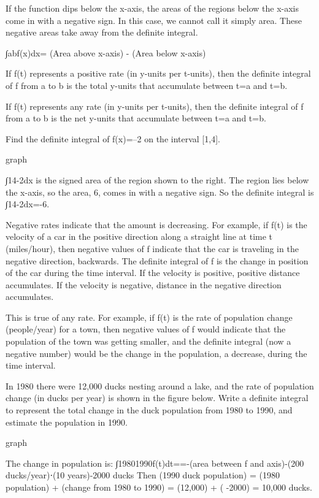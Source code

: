 If the function dips below the x-axis, the areas of the regions below the x-axis come in with a negative sign. In this case, we cannot call it simply area. These negative areas take away from the definite integral.

∫abf(x)dx= (Area above x-axis) - (Area below x-axis)

If f(t) represents a positive rate (in y-units per t-units), then the definite integral of f from a to b is the total y-units that accumulate between t=a and t=b.

If f(t) represents any rate (in y-units per t-units), then the definite integral of f from a to b is the net y-units that accumulate between t=a and t=b.

\begin{example}
Find the definite integral of f(x)=–2 on the interval [1,4].

graph
\begin{solution}
∫14-2dx is the signed area of the region shown to the right. The region lies below the x-axis, so the area, 6, comes in with a negative sign. So the definite integral is ∫14-2dx=-6.
\end{solution}\end{example}

Negative rates indicate that the amount is decreasing. For example, if f(t) is the velocity of a car in the positive direction along a straight line at time t (miles/hour), then negative values of f indicate that the car is traveling in the negative direction, backwards. The definite integral of f is the change in position of the car during the time interval. If the velocity is positive, positive distance accumulates. If the velocity is negative, distance in the negative direction accumulates.

This is true of any rate. For example, if f(t) is the rate of population change (people/year) for a town, then negative values of f would indicate that the population of the town was getting smaller, and the definite integral (now a negative number) would be the change in the population, a decrease, during the time interval.

\begin{example}
In 1980 there were 12,000 ducks nesting around a lake, and the rate of population change (in ducks per year) is shown in the figure below. Write a definite integral to represent the total change in the duck population from 1980 to 1990, and estimate the population in 1990.

graph
\begin{solution}
The change in population is:
∫19801990f(t)dt=\approx   =-(area between f and axis)-(200 ducks/year)⋅(10 years)-2000 ducks
Then (1990 duck population) = (1980 population) + (change from 1980 to 1990) = (12,000) + ( -2000) = 10,000 ducks.
\end{solution}\end{example}

